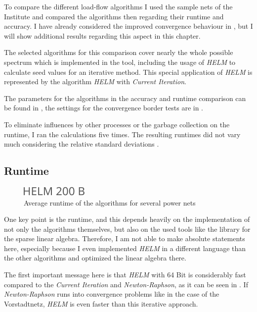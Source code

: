 To compare the different load-flow algorithms I used the sample nets of the Institute and compared the algorithms then regarding their runtime and accuracy. I have already considered the improved convergence behaviour in , but I will show additional results regarding this aspect in this chapter.

The selected algorithms for this comparison cover nearly the whole possible spectrum which is implemented in the tool, including the usage of \emph{HELM} to calculate seed values for an iterative method. This special application of \emph{HELM} is represented by the algorithm \emph{HELM} with \emph{Current Iteration}.

The parameters for the algorithms in the accuracy and runtime comparison can be found in , the settings for the convergence border tests are in .

To eliminate influences by other processes or the garbage collection on the runtime, I ran the calculations five times. The resulting runtimes did not vary much considering the relative standard deviations .

\subsection{Runtime}

\begin{figure}
	\centering
	\includegraphics[scale=0.7]{figures/comparison_runtime}
	\caption[Comparison, average runtime]{Average runtime of the algorithms for several power nets}
	\label{fig:comparison_runtime}
\end{figure}

One key point is the runtime, and this depends heavily on the implementation of not only the algorithms themselves, but also on the used tools like the library for the sparse linear algebra. Therefore, I am not able to make absolute statements here, especially because I even implemented \emph{HELM} in a different language than the other algorithms and optimized the linear algebra there.

The first important message here is that \emph{HELM} with 64 Bit is considerably fast compared to the \emph{Current Iteration} and \emph{Newton-Raphson}, as it can be seen in . If \emph{Newton-Raphson} runs into convergence problems like in the case of the Vorstadtnetz, \emph{HELM} is even faster than this iterative approach. 

